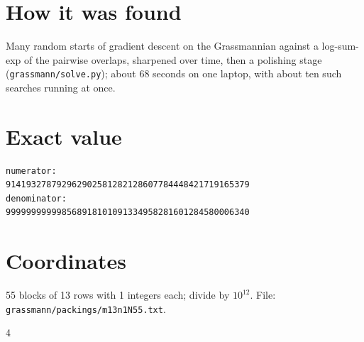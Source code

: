 \documentclass[11pt,a4paper]{article}
\begin{document}
\section{How it was found}
Many random starts of gradient descent on the Grassmannian against a log-sum-exp of the pairwise overlaps, sharpened over time, then a polishing stage (\texttt{grassmann/solve.py}); about 68 seconds on one laptop, with about ten such searches running at once.


\appendix
\section{Exact value}
{\small
\begin{verbatim}
numerator:
914193278792962902581282128607784448421719165379
denominator:
999999999998568918101091334958281601284580006340
\end{verbatim}}

\section{Coordinates}
55 blocks of 13 rows with 1 integers each; divide by $10^{12}$. File: \texttt{grassmann/packings/m13n1N55.txt}.
{\tiny
\begin{multicols}{4}
\end{multicols}}
\end{document}
